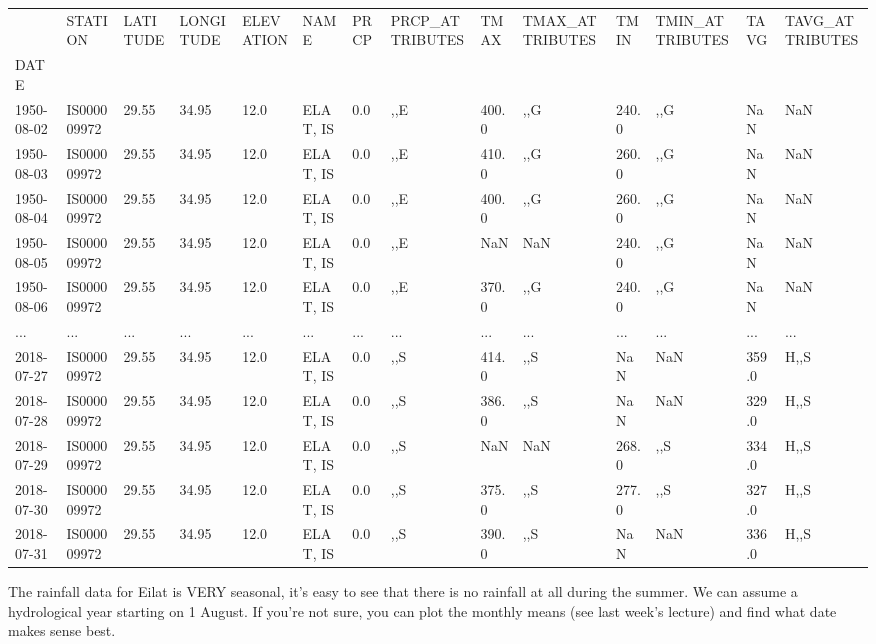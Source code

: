 \documentclass[
  letterpaper,
  DIV=11,
  numbers=noendperiod]{scrreprt}
\begin{document}
\begin{longtable}[]{@{}llllllllllllll@{}}
\toprule()
& STATION & LATITUDE & LONGITUDE & ELEVATION & NAME & PRCP &
PRCP\_ATTRIBUTES & TMAX & TMAX\_ATTRIBUTES & TMIN & TMIN\_ATTRIBUTES &
TAVG & TAVG\_ATTRIBUTES \\
DATE & & & & & & & & & & & & & \\
\midrule()
\endhead
1950-08-02 & IS000009972 & 29.55 & 34.95 & 12.0 & ELAT, IS & 0.0 & ,,E &
400.0 & ,,G & 240.0 & ,,G & NaN & NaN \\
1950-08-03 & IS000009972 & 29.55 & 34.95 & 12.0 & ELAT, IS & 0.0 & ,,E &
410.0 & ,,G & 260.0 & ,,G & NaN & NaN \\
1950-08-04 & IS000009972 & 29.55 & 34.95 & 12.0 & ELAT, IS & 0.0 & ,,E &
400.0 & ,,G & 260.0 & ,,G & NaN & NaN \\
1950-08-05 & IS000009972 & 29.55 & 34.95 & 12.0 & ELAT, IS & 0.0 & ,,E &
NaN & NaN & 240.0 & ,,G & NaN & NaN \\
1950-08-06 & IS000009972 & 29.55 & 34.95 & 12.0 & ELAT, IS & 0.0 & ,,E &
370.0 & ,,G & 240.0 & ,,G & NaN & NaN \\
... & ... & ... & ... & ... & ... & ... & ... & ... & ... & ... & ... &
... & ... \\
2018-07-27 & IS000009972 & 29.55 & 34.95 & 12.0 & ELAT, IS & 0.0 & ,,S &
414.0 & ,,S & NaN & NaN & 359.0 & H,,S \\
2018-07-28 & IS000009972 & 29.55 & 34.95 & 12.0 & ELAT, IS & 0.0 & ,,S &
386.0 & ,,S & NaN & NaN & 329.0 & H,,S \\
2018-07-29 & IS000009972 & 29.55 & 34.95 & 12.0 & ELAT, IS & 0.0 & ,,S &
NaN & NaN & 268.0 & ,,S & 334.0 & H,,S \\
2018-07-30 & IS000009972 & 29.55 & 34.95 & 12.0 & ELAT, IS & 0.0 & ,,S &
375.0 & ,,S & 277.0 & ,,S & 327.0 & H,,S \\
2018-07-31 & IS000009972 & 29.55 & 34.95 & 12.0 & ELAT, IS & 0.0 & ,,S &
390.0 & ,,S & NaN & NaN & 336.0 & H,,S \\
\bottomrule()
\end{longtable}

The rainfall data for Eilat is VERY seasonal, it's easy to see that
there is no rainfall at all during the summer. We can assume a
hydrological year starting on 1 August. If you're not sure, you can plot
the monthly means (see last week's lecture) and find what date makes
sense best.
\end{document}
